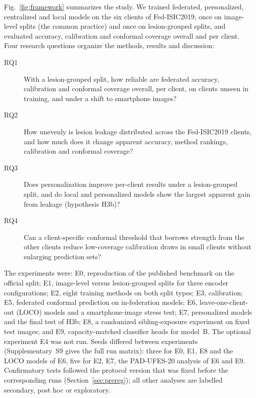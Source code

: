 \documentclass[VANCOUVER,Times1COL]{WileyNJDv5}
\begin{document}
Fig.~\ref{fig:framework} summarizes the study. We trained federated, personalized, centralized and
local models on the six clients of Fed-ISIC2019, once on image-level splits (the common practice) and
once on lesion-grouped splits, and evaluated accuracy, calibration and conformal coverage overall and per
client. Four research questions organize the methods, results and discussion:

\begin{description}
\item[RQ1] With a lesion-grouped split, how reliable are federated accuracy, calibration and conformal
  coverage overall, per client, on clients unseen in training, and under a shift to smartphone images?
\item[RQ2] How unevenly is lesion leakage distributed across the Fed-ISIC2019 clients, and how much does
  it change apparent accuracy, method rankings, calibration and conformal coverage?
\item[RQ3] Does personalization improve per-client results under a lesion-grouped split, and do local
  and personalized models show the largest apparent gain from leakage (hypothesis H3b)?
\item[RQ4] Can a client-specific conformal threshold that borrows strength from the other clients
  reduce low-coverage calibration draws in small clients without enlarging prediction sets?
\end{description}

The experiments were: E0, reproduction of the published benchmark on the official split; E1,
image-level versus lesion-grouped splits for three encoder configurations; E2, eight training methods on
both split types; E3, calibration; E5, federated conformal prediction on in-federation models; E6,
leave-one-client-out (LOCO) models and a smartphone-image stress test; E7, personalized models and the
final test of H3b; E8, a randomized sibling-exposure experiment on fixed test images; and E9,
capacity-matched classifier heads for model~B. The optional experiment E4 was not run. Seeds differed
between experiments (Supplementary~S9 gives the full run matrix): three for E0, E1, E8 and the LOCO models of E6, five for E2, E7, the PAD-UFES-20 analysis of E6
and E9. Confirmatory tests followed the protocol version that was fixed before the corresponding runs
(Section~\ref{sec:prereg}); all other analyses are labelled secondary, post hoc or exploratory.
\end{document}
